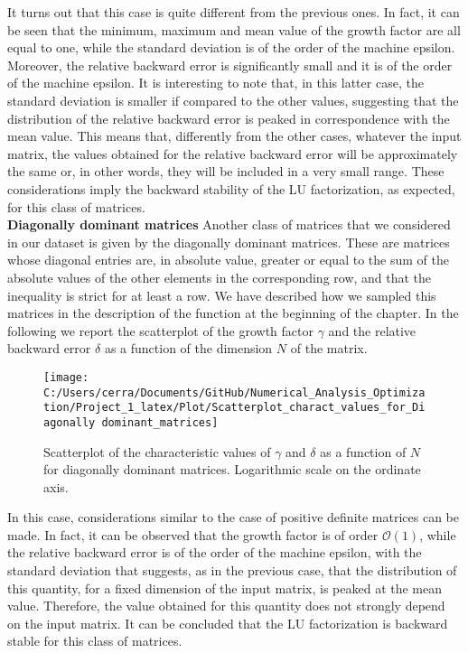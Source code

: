 \documentclass[a4paper,11pt]{report}
\begin{document}
\noindent It turns out that this case is quite different from the previous ones. In fact, it can be seen that the minimum, maximum and mean value of the growth factor are all equal to one, while the standard deviation is of the order of the machine epsilon. Moreover, the relative backward error is significantly small and it is of the order of the machine epsilon. It is interesting to note that, in this latter case, the standard deviation is smaller if compared to the other values, suggesting that the distribution of the relative backward error is peaked in correspondence with the mean value. This means that, differently from the other cases, whatever the input matrix, the values obtained for the relative backward error will be approximately the same or, in other words, they will be included in a very small range. These considerations imply the backward stability of the LU factorization, as expected, for this class of matrices.\\

\noindent \textbf{Diagonally dominant matrices } Another class of matrices that we considered in our dataset is given by the diagonally dominant matrices. These are matrices whose diagonal entries are, in absolute value, greater or equal to the sum of the absolute values of the other elements in the corresponding row, and that the inequality is strict for at least a row. We have described how we sampled this matrices in the description of the function at the beginning of the chapter. In the following we report the scatterplot of the growth factor $\gamma$ and the relative backward error $\delta$ as a function of the dimension $N$ of the matrix.

\begin{figure}[H]
	\centering
	\texttt{[image: C:/Users/cerra/Documents/GitHub/Numerical\_Analysis\_Optimization/Project\_1\_latex/Plot/Scatterplot\_charact\_values\_for\_Diagonally dominant\_matrices]}
	\caption{Scatterplot of the characteristic values of $\gamma$ and $\delta$ as a function of $N$ for diagonally dominant matrices. Logarithmic scale on the ordinate axis.}
	\label{fig:Scatterplot_Diag_dom}
\end{figure}

\noindent In this case, considerations similar to the case of positive definite matrices can be made. In fact, it can be observed that the growth factor is of order $\mathcal{O}(1)$, while the relative backward error is of the order of the machine epsilon, with the standard deviation that suggests, as in the previous case, that the distribution of this quantity, for a fixed dimension of the input matrix, is peaked at the mean value. Therefore, the value obtained for this quantity does not strongly depend on the input matrix. It can be concluded that the LU factorization is backward stable for this class of matrices.\\
\end{document}
